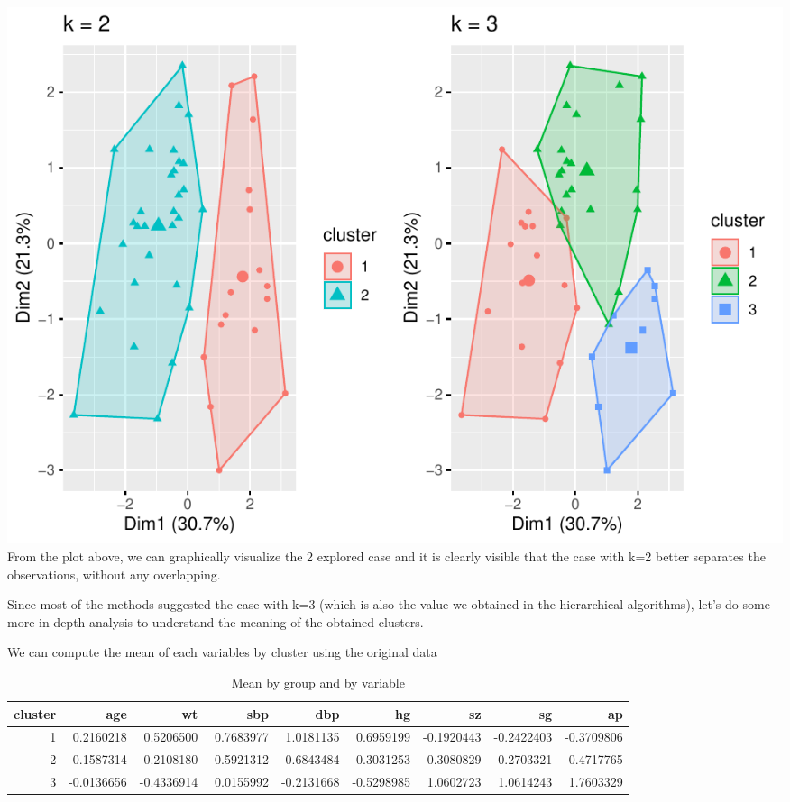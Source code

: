 \documentclass[
]{article}
\newenvironment{Shaded}{\begin{snugshade}}{\end{snugshade}}
\newcommand{\AttributeTok}[1]{\textcolor[rgb]{0.77,0.63,0.00}{#1}}
\newcommand{\FunctionTok}[1]{\textcolor[rgb]{0.00,0.00,0.00}{#1}}
\newcommand{\NormalTok}[1]{#1}
\newcommand{\SpecialCharTok}[1]{\textcolor[rgb]{0.00,0.00,0.00}{#1}}
\newcommand{\StringTok}[1]{\textcolor[rgb]{0.31,0.60,0.02}{#1}}
\begin{document}
\includegraphics{clustering_files/figure-latex/unnamed-chunk-63-1.pdf}
From the plot above, we can graphically visualize the 2 explored case
and it is clearly visible that the case with k=2 better separates the
observations, without any overlapping.

Since most of the methods suggested the case with k=3 (which is also the
value we obtained in the hierarchical algorithms), let's do some more
in-depth analysis to understand the meaning of the obtained clusters.

We can compute the mean of each variables by cluster using the original
data

\begin{Shaded}
\end{Shaded}

\begin{table}

\caption{\label{tab:unnamed-chunk-64}Mean by group and by variable}
\centering
\begin{tabular}[t]{r|r|r|r|r|r|r|r|r}
\hline
cluster & age & wt & sbp & dbp & hg & sz & sg & ap\\
\hline
1 & 0.2160218 & 0.5206500 & 0.7683977 & 1.0181135 & 0.6959199 & -0.1920443 & -0.2422403 & -0.3709806\\
\hline
2 & -0.1587314 & -0.2108180 & -0.5921312 & -0.6843484 & -0.3031253 & -0.3080829 & -0.2703321 & -0.4717765\\
\hline
3 & -0.0136656 & -0.4336914 & 0.0155992 & -0.2131668 & -0.5298985 & 1.0602723 & 1.0614243 & 1.7603329\\
\hline
\end{tabular}
\end{table}
\end{document}
